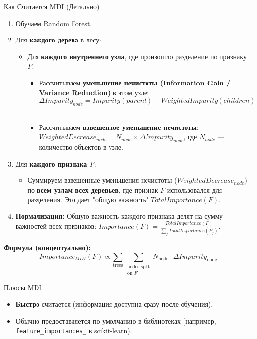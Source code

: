 \begin{myexampleblock}{Как Считается MDI (Детально)}
    \begin{enumerate}[nosep, wide, labelindent=0pt]
        \item Обучаем Random Forest.
        \item Для \textbf{каждого дерева} в лесу:
            \begin{itemize}[nosep, leftmargin=*]
                \item Для \textbf{каждого внутреннего узла}, где произошло разделение по признаку $F$:
                    \begin{itemize}[label=\textbullet, nosep, leftmargin=*]
                    \item Рассчитываем \textbf{уменьшение нечистоты (Information Gain / Variance Reduction)} в этом узле: $\Delta Impurity_{node} = Impurity(parent) - WeightedImpurity(children)$.
                    \item Рассчитываем \textbf{взвешенное уменьшение нечистоты}: $WeightedDecrease_{node} = N_{node} \times \Delta Impurity_{node}$, где $N_{node}$ — количество объектов в узле.
                    \end{itemize}
            \end{itemize}
        \item Для \textbf{каждого признака $F$}:
            \begin{itemize}[nosep, leftmargin=*]
                \item Суммируем взвешенные уменьшения нечистоты ($WeightedDecrease_{node}$) по \textbf{всем узлам всех деревьев}, где признак $F$ использовался для разделения. Это дает "общую важность" $TotalImportance(F)$.
            \end{itemize}
        \item \textbf{Нормализация:} Общую важность каждого признака делят на сумму важностей всех признаков: $Importance(F) = \frac{TotalImportance(F)}{\sum_{j} TotalImportance(F_j)}$.
    \end{enumerate}
    \textbf{Формула (концептуально):}
    \[
    Importance_{MDI}(F) \propto \sum_{\text{trees}} \sum_{\substack{\text{nodes split} \\ \text{on } F}} N_{\text{node}} \cdot \Delta Impurity_{\text{node}}
    \]
\end{myexampleblock}

\begin{myblock}{Плюсы MDI}
    \begin{itemize}[nosep, leftmargin=*]
        \item \textbf{Быстро} считается (информация доступна сразу после обучения).
        \item Обычно предоставляется по умолчанию в библиотеках (например, \texttt{feature\_importances\_} в scikit-learn).
    \end{itemize}
\end{myblock}

